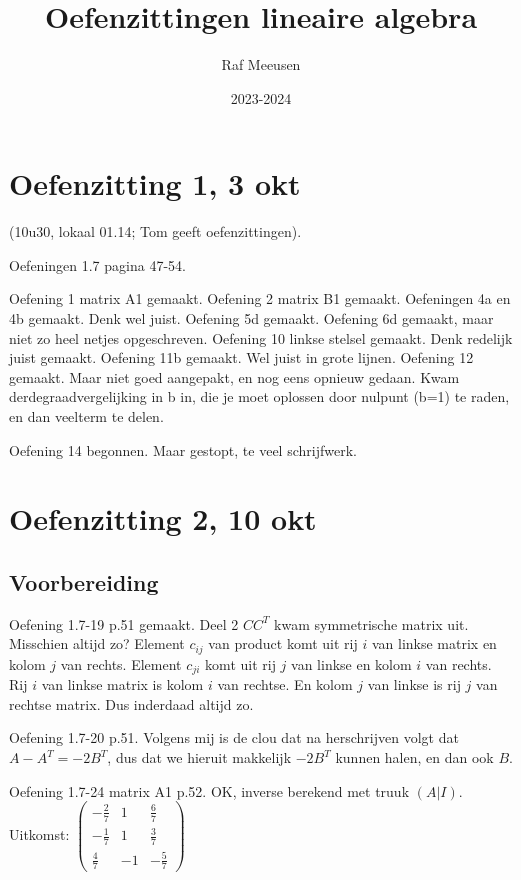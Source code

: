 \documentclass{article}
\title{Oefenzittingen lineaire algebra}
\author{Raf Meeusen}
\date{2023-2024}
\begin{document}
\maketitle

\section{Oefenzitting 1, 3 okt}

(10u30, lokaal 01.14; Tom geeft oefenzittingen). 

Oefeningen 1.7 pagina 47-54. 

Oefening 1 matrix A1 gemaakt. 
Oefening 2 matrix B1 gemaakt. 
Oefeningen 4a en 4b gemaakt. Denk wel juist. 
Oefening 5d gemaakt. 
Oefening 6d gemaakt, maar niet zo heel netjes opgeschreven. 
Oefening 10 linkse stelsel gemaakt. Denk redelijk juist gemaakt. 
Oefening 11b gemaakt. Wel juist in grote lijnen. 
Oefening 12 gemaakt. Maar niet goed aangepakt, en nog eens opnieuw gedaan. Kwam derdegraadvergelijking in b in, die je moet oplossen door nulpunt (b=1) te raden, en dan veelterm te delen. 



Oefening 14 begonnen. Maar gestopt, te veel schrijfwerk. 



\section{Oefenzitting 2, 10 okt}

\subsection{Voorbereiding}

Oefening 1.7-19 p.51 gemaakt. Deel 2 $C C^T$ kwam symmetrische matrix uit. Misschien altijd zo? Element $c_{ij}$ van product komt uit rij $i$ van linkse matrix en kolom $j$ van rechts. Element $c_{ji}$ komt uit rij $j$ van linkse en kolom $i$ van rechts. Rij $i$ van linkse matrix is kolom $i$ van rechtse. En kolom $j$ van linkse is rij $j$ van rechtse matrix. Dus inderdaad altijd zo. 


Oefening 1.7-20 p.51. Volgens mij is de clou dat na herschrijven volgt dat $A-A^T = -2B^T$, dus dat we hieruit makkelijk $-2B^T$ kunnen halen, en dan ook $B$. 

Oefening 1.7-24 matrix A1 p.52. OK, inverse berekend met truuk $(A|I)$. Uitkomst: 
\begin{math}
\begin{pmatrix}
-\frac{2}{7} & 1 & \frac{6}{7}\\
-\frac{1}{7} & 1 & \frac{3}{7} \\
\frac{4}{7} & -1 & -\frac{5}{7} 
\end{pmatrix}
\end{math}
\end{document}
